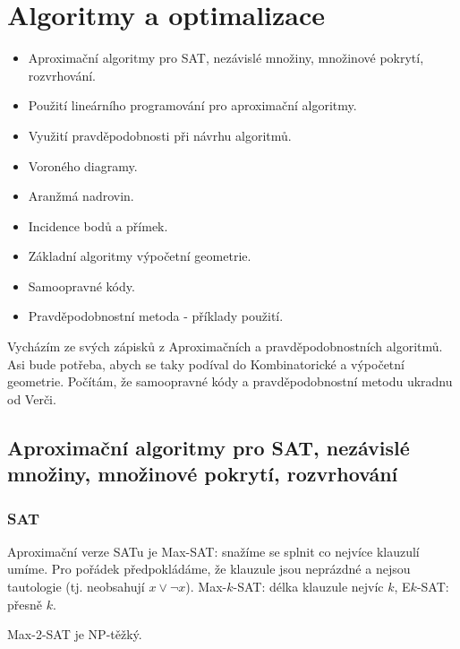 \documentclass[a4paper,10pt,titlepage]{article} \usepackage[utf8]{inputenc}
\begin{document}
 \pagestyle{empty}
\chapter{Algoritmy a optimalizace}

\begin{itemize}
\item Aproximační algoritmy pro SAT, nezávislé množiny, množinové pokrytí,
	rozvrhování.
\item Použití lineárního programování pro aproximační algoritmy.
\item Využití pravděpodobnosti při návrhu algoritmů.
\item Voroného diagramy.
\item Aranžmá nadrovin.
\item Incidence bodů a přímek.
\item Základní algoritmy výpočetní geometrie.
\item Samoopravné kódy.
\item Pravděpodobnostní metoda - příklady použití.
\end{itemize}

Vycházím ze svých zápisků z Aproximačních a pravděpodobnostních algoritmů.
Asi bude potřeba, abych se taky podíval do Kombinatorické a výpočetní geometrie.
Počítám, že samoopravné kódy a pravděpodobnostní metodu ukradnu od Verči.

\section{Aproximační algoritmy pro SAT, nezávislé množiny, množinové pokrytí,
	rozvrhování}

\subsection{SAT}
Aproximační verze SATu je Max-SAT: snažíme se splnit co nejvíce klauzulí umíme.
Pro pořádek předpokládáme, že klauzule jsou neprázdné a nejsou tautologie
(tj. neobsahují $x\vee\neg x$).
Max-$k$-SAT: délka klauzule nejvíc $k$, E$k$-SAT: přesně $k$.

Max-2-SAT je NP-těžký.
\end{document}
